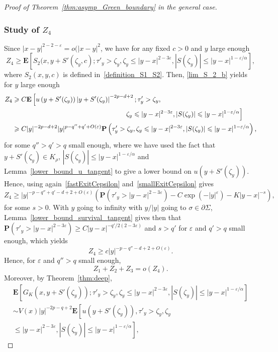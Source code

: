 \documentclass[10pt]{amsart}
\theoremstyle{definition}\newtheorem{defi}[theo]{Definition}\newtheorem{rema}[theo]{Remark}\newtheorem{exam}[theo]{Example}\newtheorem{exem}[theo]{Example}\newtheorem{nota}[theo]{Notation}
\newcommand{\pr}{\mathbf{P}}
\newcommand{\e}{\mathbf{E}}
\renewcommand{\epsilon}{\varepsilon}
\renewcommand{\leq}{\leqslant}
\renewcommand{\geq}{\geqslant}
\begin{document}
\begin{proof}[Proof of Theorem~\ref{thm:asymp_Green_boundary} in the general case]
\subsubsection*{Study of \texorpdfstring{$Z_4$}{Z4}}
Since $| x-y|^{2-2-\epsilon}=o(| x-y|^2$, we have for any fixed $c>0$ and $y$ large enough
\[
Z_{4}\geq\e\left[S_2(x,y+S'\left(\zeta_{y},c\right);\tau'_{y}>\zeta_{y},\zeta_{y}\leq |y-x|^{2-3\epsilon},|S(\zeta_{y})| \leq | y-x|^{1-\epsilon/\alpha}\right],
\]
where $S_2(x,y,c)$ is defined in~\eqref{definition_S1_S2}. Then, \eqref{lim_S_2_b} yields for $y$ large enough
\begin{align*}
Z_{4}
&\geq C\e\left[u\left(y+S'(\zeta_{y})\right)\left|y+S'(\zeta_{y})\right|^{-2p-d+2};\tau'_{y}>\zeta_{y},\right.\\
&\mkern306mu\zeta_{y}\left.\leq |y-x|^{2-3\epsilon},\left|S(\zeta_{y})\right| \leq |y-x|^{1-\epsilon/\alpha}\right]\\
&\geq C|y|^{-2p-d+2}|y|^{p-q''+q'+O(\epsilon)}\pr\left(\tau'_{y}>\zeta_{y},\zeta_{y}\leq |y-x|^{2-3\epsilon},| S(\zeta_{y})| \leq |y-x|^{1-\epsilon/\alpha}\right),
\end{align*}
for some $q''>q'>q$ small enough, where we have used the fact that $y+S'(\zeta_{y})\in{K}_{\rho}$, $| S(\zeta_{y})| \leq | y-x|^{1-\epsilon/\alpha}$ and Lemma~\ref{lower_bound_u_tangent} to give a lower bound on $u(y+S'(\zeta_{y}))$. Hence, using again~\eqref{fastExitCepsilon} and~\eqref{smallExitCepsilon} gives
\[
Z_{4}\geq |y|^{-p-q''+q'-d+2+O(\epsilon)}\left(\pr\left(\tau'_{y}>|y-x|^{2-3\epsilon}\right)-C\exp\left(-| y|^{\epsilon}\right)-K |y-x|^{-s}\right),
\]
for some $s>0$. With $y$ going to infinity with $y/| y|$ going to $\sigma\in\partial \Sigma$, Lemma~\ref{lower_bound_survival_tangent} gives then that $\pr(\tau'_{y}>| y-x|^{2-3\epsilon}) \geq C | y-x|^{-q'/2(2-3\epsilon)}$ and $s>q'$ for $\epsilon$ and $q'>q$ small enough, which yields
\[
Z_{4}\geq c| y|^{-p-q''-d+2+O(\epsilon)}.
\]
Hence, for $\epsilon$ and $q''>q$ small enough,
\[
Z_{1}+Z_{2}+Z_{3}=o(Z_{4}).
\]
Moreover, by Theorem~\ref{thm:deep},
\begin{multline*}
\e\left[G_{K}\left(x,y+S'(\zeta_{y})\right);\tau'_{y}>\zeta_{y},\zeta_{y}\leq |y-x|^{2-3\epsilon},| S(\zeta_{y})| \leq |y-x|^{1-\epsilon/\alpha}\right]\\
\sim V(x)|y|^{-2p-q+2}\e\left[u\left(y+S'(\zeta_{y})\right),\tau'_{y}>\zeta_{y},\zeta_{y}\right.\\
\left.\leq |y-x|^{2-3\epsilon},|S(\zeta_{y})|\leq | y-x|^{1-\epsilon/\alpha}\right],
\end{multline*}

\end{proof}
\end{document}
